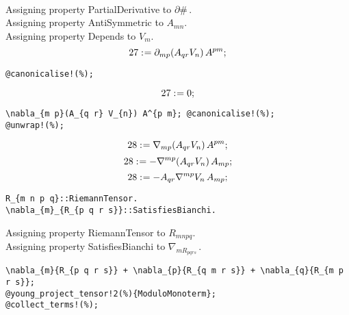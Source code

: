 \documentclass[11pt]{article}
\def\specialcolon{\mathrel{\mathop{:}}\hspace{-.5em}}
\begin{document}
\\
Assigning property PartialDerivative to $\partial{\#}\, $.
\\
Assigning property AntiSymmetric to ${A}_{m n}$.
\\
Assigning property Depends to ${V}_{m}$.
\\
\begin{dmath*}[compact, spread=2pt]
27\specialcolon{}= {\partial}_{m p}{({A}_{q r} {V}_{n})}\,  {A}^{p m};
\end{dmath*}
{\color[named]{Blue}\begin{verbatim}
@canonicalise!(%);
\end{verbatim}}
\begin{dmath*}[compact, spread=2pt]
27\specialcolon{}= 0;
\end{dmath*}
{\color[named]{Blue}\begin{verbatim}
\nabla_{m p}(A_{q r} V_{n}) A^{p m}; @canonicalise!(%);
@unwrap!(%);
\end{verbatim}}
\begin{dmath*}[compact, spread=2pt]
28\specialcolon{}= {\nabla}_{m p}{({A}_{q r} {V}_{n})}\,  {A}^{p m};
\end{dmath*}
\begin{dmath*}[compact, spread=2pt]
28\specialcolon{}= -{\nabla}^{m p}{({A}_{q r} {V}_{n})}\,  {A}_{m p};
\end{dmath*}
\begin{dmath*}[compact, spread=2pt]
28\specialcolon{}= -{A}_{q r} {\nabla}^{m p}{{V}_{n}}\,  {A}_{m p};
\end{dmath*}
{\color[named]{Blue}\begin{verbatim}
R_{m n p q}::RiemannTensor.
\nabla_{m}_{R_{p q r s}}::SatisfiesBianchi.
\end{verbatim}}
Assigning property RiemannTensor to ${R}_{m n p q}$.
\\
Assigning property SatisfiesBianchi to ${\nabla}_{m {R}_{p q r s}}\, $.
\\
{\color[named]{Blue}\begin{verbatim}
\nabla_{m}{R_{p q r s}} + \nabla_{p}{R_{q m r s}} + \nabla_{q}{R_{m p r s}};
@young_project_tensor!2(%){ModuloMonoterm};
@collect_terms!(%);
\end{verbatim}}
\end{document}
